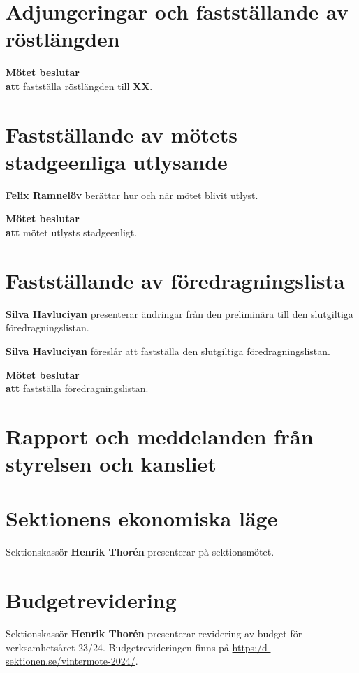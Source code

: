 \documentclass{datateknologsektionen-document}
\newcommand{\ind}{\hspace*{2em}}
\newcommand{\motetbeslutar}{\textbf{Mötet beslutar}}
\newcommand{\att}{\\\ind\textbf{att}}
\begin{document}
\section{Adjungeringar och fastställande av röstlängden}



\motetbeslutar
\att{} fastställa röstlängden till \textbf{XX}.



\section{Fastställande av mötets stadgeenliga utlysande}
\textbf{Felix Ramnelöv} berättar hur och när mötet blivit utlyst.

\motetbeslutar
\att{} mötet utlysts stadgeenligt.



\pagebreak
\section{Fastställande av föredragningslista}
\textbf{Silva Havluciyan} presenterar ändringar från den preliminära till den slutgiltiga föredragningslistan.

\textbf{Silva Havluciyan} föreslår att fastställa den slutgiltiga föredragningslistan.

\motetbeslutar\att{} fastställa föredragningslistan.


\section{Rapport och meddelanden från styrelsen och kansliet}




\pagebreak
\section{Sektionens ekonomiska läge}
Sektionskassör \textbf{Henrik Thorén} presenterar på sektionsmötet.



\section{Budgetrevidering}
Sektionskassör \textbf{Henrik Thorén} presenterar revidering av budget för verksamhetsåret 23/24. Budgetrevideringen finns på \url{https:/d-sektionen.se/vintermote-2024/}.
\end{document}
